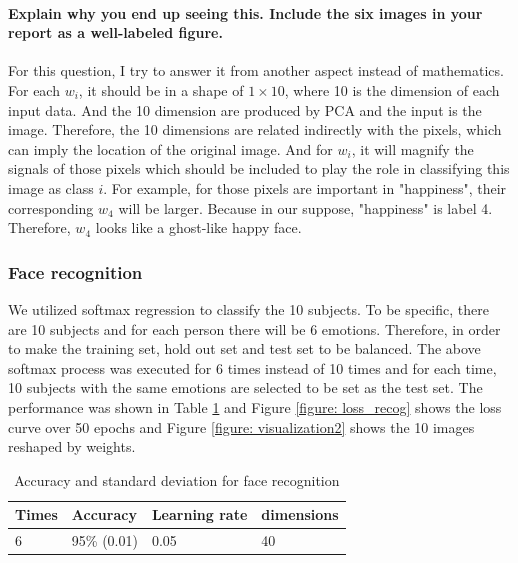 \documentclass{article}
\begin{document}
\paragraph{Explain why you end up seeing this. Include the six images in your report as a well-labeled figure.} For this question, I try to answer it from another aspect instead of mathematics. For each $w_i$, it should be in a shape of $1\times10$, where 10 is the dimension of each input data. And the 10 dimension are produced by PCA and the input is the image. Therefore, the 10 dimensions are related indirectly with the pixels, which can imply the location of the original image. And for $w_i$, it will magnify the signals of those pixels which should be included to play the role in classifying this image as class $i$. For example, for those pixels are important in "happiness", their corresponding $w_4$ will be larger. Because in our suppose, "happiness" is label 4. Therefore, $w_4$ looks like a ghost-like happy face.
\subsubsection{Face recognition}
We utilized softmax regression to classify the 10 subjects. To be specific, there are 10 subjects and for each person there will be 6 emotions. Therefore, in order to make the training set, hold out set and test set to be balanced. The above softmax process was executed for 6 times instead of 10 times and for each time, 10 subjects with the same emotions are selected to be set as the test set. The performance was shown in Table \ref{table: face_recog} and Figure \ref{figure: loss_recog} shows the loss curve over 50 epochs and Figure \ref{figure: visualization2} shows the 10 images reshaped by weights.

\begin{table}[ht]
  \caption{Accuracy and standard deviation for face recognition}
  \label{table: face_recog}
  \centering
  \begin{tabular}{llll}
    \toprule
    \cmidrule(r){1-4}
    Times     &Accuracy&Learning rate&dimensions \\
    \midrule
    6  &95\% (0.01)&0.05&40\\
    \bottomrule
  \end{tabular}
\end{table}
\end{document}
